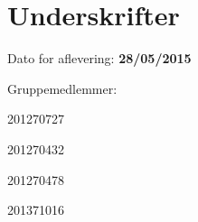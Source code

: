 \chapter*{Underskrifter}

Dato for aflevering: \textbf{28/05/2015}

Gruppemedlemmer:
\vspace{2cm}

\signature{Anders Bæk Møller}{201270727}
\signature{Bjørn Sørensen}{201270432}
\signature{Jesper Christensen}{201270478}
\signature{Lasse Beck Thostrup}{}
\signature{Lars Harup Holm}{}
\signature{Loc Dai Le}{201371016}
\signature{Michael Toft Jensen}{}

\vspace{2cm}
\signature{Vejleder: Frank Bodholdt Jakobsen}{}
